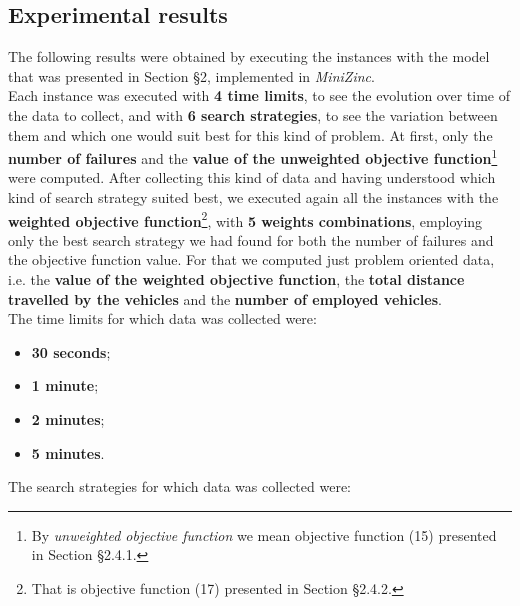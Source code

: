 \documentclass[../main.tex]{subfiles}
\begin{document}
\subsection{Experimental results}
The following results were obtained by executing the instances with the model that was presented in Section §2, implemented in \textit{MiniZinc}.\\
Each instance was executed with \textbf{4 time limits}, to see the evolution over time of the data to collect, and with \textbf{6 search strategies}, to see the variation between them and which one would suit best for this kind of problem.
At first, only the \textbf{number of failures} and the \textbf{value of the unweighted objective function}\footnote{By \textit{unweighted objective function} we mean objective function (15) presented in Section §2.4.1.} were computed.
After collecting this kind of data and having understood which kind of search strategy suited best, we executed again all the instances with the \textbf{weighted objective function}\footnote{That is objective function (17) presented in Section §2.4.2.}, with \textbf{5 weights combinations}, employing only the best search strategy we had found for both the number of failures and the objective function value.
For that we computed just problem oriented data, i.e. the \textbf{value of the weighted objective function}, the \textbf{total distance travelled by the vehicles} and the \textbf{number of employed vehicles}.\\
The time limits for which data was collected were:
\begin{itemize}
    \item \textbf{30 seconds};
    \item \textbf{1 minute};
    \item \textbf{2 minutes};
    \item \textbf{5 minutes}.
\end{itemize}
The search strategies for which data was collected were:
\end{document}
